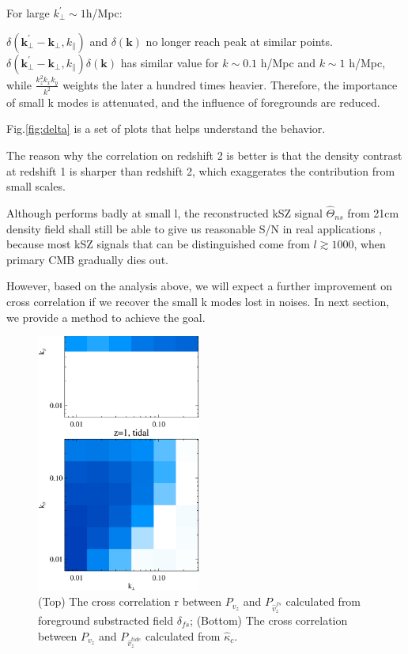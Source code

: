 For large $k_\perp^\prime\sim 1$h/Mpc:

$\delta(\bm{k_\perp^{\prime}}-\bm{k_\perp},k_\parallel)$ and $\delta(\bm{k})$ 
no longer reach peak at similar points.  
$\delta(\bm{k_\perp^{\prime}}-\bm{k_\perp},k_\parallel)\delta(\bm{k})$ 
has similar value for $k\sim 0.1$ h/Mpc and $k\sim 1$ h/Mpc, 
while $\frac{k_z^2k_xk_y}{k^2}$ weights the later a hundred times heavier.
Therefore, the importance of small k modes is attenuated, 
and the influence of foregrounds are reduced.

Fig.\ref{fig:delta} is a set of plots that helps understand the behavior.

The reason why the correlation on redshift 2 is better is that 
the density contrast at redshift 1 is sharper than redshift 2, 
which exaggerates the contribution from small scales.

Although performs badly at small l, the reconstructed kSZ signal $\hat \Theta_{ns}$ 
from 21cm density field shall still be able to give us reasonable S/N in real applications  
, because most kSZ signals that can be distinguished come from $l\gtrsim 1000$, when primary CMB gradually dies out. 

However, based on the analysis above, 
we will expect a further improvement on cross correlation 
if we recover the small k modes lost in noises. 
In next section, we provide a method to achieve the goal.


\begin{figure}[tbp]
\begin{center}
\includegraphics[width=0.48\textwidth]{compare_powv2d_z1z2.eps}
\end{center}
\vspace{-0.7cm}
\caption{(Top) The cross correlation r between $P_{v_z}$ and 
    $P_{\hat v_z^{fs}}$ calculated from foreground substracted field $\delta_{fs}$; 
    (Bottom) The cross correlation between $P_{v_z}$ and $P_{\hat v_z^{tide}}$ calculated from $\hat \kappa_c$. 
}
\label{fig:v}
\end{figure}
